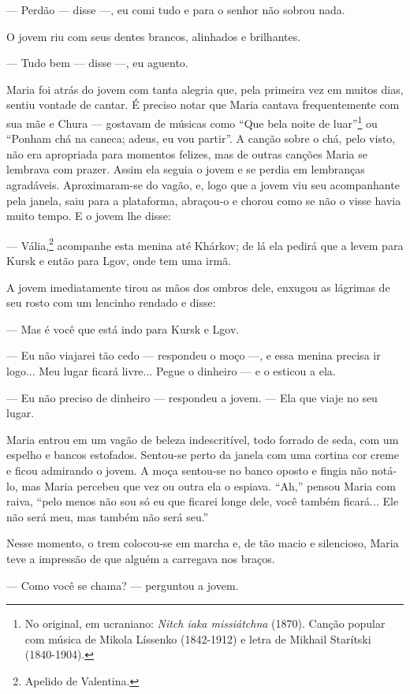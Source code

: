 --- Perdão --- disse ---, eu comi tudo e para o senhor não sobrou nada.

O jovem riu com seus dentes brancos, alinhados e brilhantes.

--- Tudo bem --- disse ---, eu aguento.

Maria foi atrás do jovem com tanta alegria que, pela primeira vez em
muitos dias, sentiu vontade de cantar. É preciso notar que Maria cantava
frequentemente com sua mãe e Chura --- gostavam de músicas como ``Que
bela noite de luar''\footnote{No original, em ucraniano: \emph{Nitch
  iaka missiátchna} (1870). Canção popular com música de Mikola Líssenko
  (1842-1912) e letra de Mikhail Starítski (1840-1904).} ou ``Ponham chá
na caneca; adeus, eu vou partir''. A canção sobre o chá, pelo visto, não
era apropriada para momentos felizes, mas de outras canções Maria se
lembrava com prazer. Assim ela seguia o jovem e se perdia em lembranças
agradáveis. Aproximaram-se do vagão, e, logo que a jovem viu seu
acompanhante pela janela, saiu para a plataforma, abraçou-o e chorou
como se não o visse havia muito tempo. E o jovem lhe disse:

--- Vália,\footnote{Apelido de Valentina.} acompanhe esta menina até
Khárkov; de lá ela pedirá que a levem para Kursk e então para Lgov, onde
tem uma irmã.

A jovem imediatamente tirou as mãos dos ombros dele, enxugou as lágrimas
de seu rosto com um lencinho rendado e disse:

--- Mas é você que está indo para Kursk e Lgov.

--- Eu não viajarei tão cedo --- respondeu o moço ---, e essa menina
precisa ir logo... Meu lugar ficará livre... Pegue o dinheiro --- e o
esticou a ela.

--- Eu não preciso de dinheiro --- respondeu a jovem. --- Ela que viaje
no seu lugar.

Maria entrou em um vagão de beleza indescritível, todo forrado de seda,
com um espelho e bancos estofados. Sentou-se perto da janela com uma
cortina cor creme e ficou admirando o jovem. A moça sentou-se no banco
oposto e fingia não notá-lo, mas Maria percebeu que vez ou outra ela o
espiava. ``Ah,'' pensou Maria com raiva, ``pelo menos não sou só eu que
ficarei longe dele, você também ficará... Ele não será meu, mas também
não será seu.''

Nesse momento, o trem colocou-se em marcha e, de tão macio e silencioso,
Maria teve a impressão de que alguém a carregava nos braços.

--- Como você se chama? --- perguntou a jovem.

